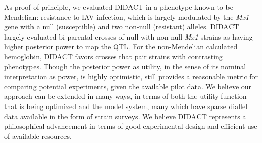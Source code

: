 As proof of principle, we evaluated DIDACT in a phenotype known to be Mendelian: resistance to IAV-infection, which is largely modulated by the \textit{Mx1} gene with a null (susceptible) and two non-null (resistant) alleles. DIDACT largely evaluated bi-parental crosses of null with non-null \textit{Mx1} strains as having higher posterior power to map the QTL. For the non-Mendelian calculated hemoglobin, DIDACT favors crosses that pair strains with contrasting phenotypes. Though the posterior power as utility, in the sense of its nominal interpretation as power, is highly optimistic, still provides a reasonable metric for comparing potential experiments, given the available pilot data. We believe our approach can be extended in many ways, in terms of both the utility function that is being optimized and the model system, many which have sparse diallel data available in the form of strain surveys. We believe DIDACT represents a philosophical advancement in terms of good experimental design and efficient use of available resources.




